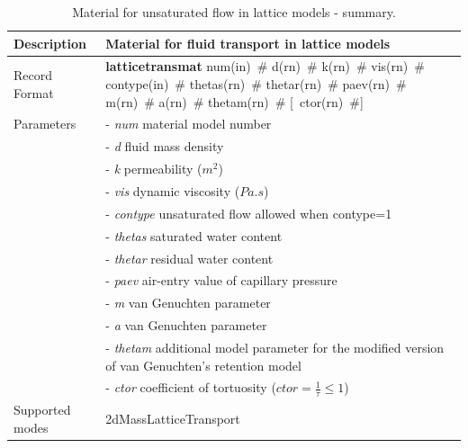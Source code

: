 \documentclass[a4paper]{article}
\newcommand{\descitem}[1]{{\noindent \bf #1}}
\newcommand{\elemparam}[2]{{{#1\tiny (#2)}~\#}}
\newcommand{\optelemparam}[2]{[{~\elemparam{#1}{#2}}]}
\newcommand{\param}[1]{{\it #1}}
\begin{document}
\begin{table}[!htb]
\begin{tabular}{|l|p{9cm}|}
\hline
Description & Material for fluid transport in lattice models\\
\hline
Record Format & 
\descitem{latticetransmat} 
\elemparam{num}{in}
\elemparam{d}{rn}
\elemparam{k}{rn} 
\elemparam{vis}{rn}
\elemparam{contype}{in}
\elemparam{thetas}{rn}
\elemparam{thetar}{rn}
\elemparam{paev}{rn}
\elemparam{m}{rn}
\elemparam{a}{rn}
\elemparam{thetam}{rn}
 \optelemparam{ctor}{rn}\\

Parameters 
&- \param{num} material model number\\
&- \param{d} fluid mass density\\
&- \param{k} permeability ($m^{2}$)\\
&- \param{vis} dynamic viscosity ($Pa.s$)\\
&- \param{contype} unsaturated flow allowed when contype=1\\
&- \param{thetas} saturated water content\\
&- \param{thetar} residual water content\\
&- \param{paev} air-entry value of capillary pressure\\
&- \param{m} van Genuchten parameter\\
&- \param{a} van Genuchten parameter\\
&- \param{thetam} additional model parameter for the modified version of van Genuchten’s retention model\\
&- \param{ctor} coefficient of tortuosity ($ctor=\frac{1}{\tau}\le1$)\\

Supported modes& 2dMassLatticeTransport\\
\hline
\end{tabular}

\caption{Material for unsaturated flow in lattice models - summary.}
\label{Iatticetransmat_table}
\end{table}



\clearpage
\end{document}
